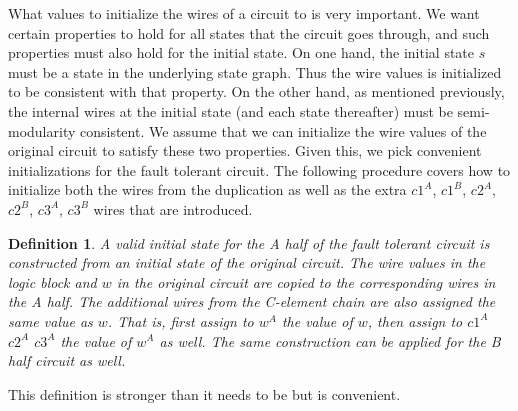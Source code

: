 \documentclass[12pt]{report}
\newtheorem*{definition}{Definition}
\begin{document}
What values to initialize the wires of a circuit to is very important.  We want certain properties to hold for all states that the circuit goes through, and such properties must also hold for the initial state.  On one hand, the initial state $s$ must be a state in the underlying state graph.  Thus the wire values is initialized to be consistent with that property.  On the other hand, as mentioned previously, the internal wires at the initial state (and each state thereafter) must be semi-modularity consistent.  We assume that we can initialize the wire values of the original circuit to satisfy these two properties.  Given this, we pick convenient initializations for the fault tolerant circuit.  The following procedure covers how to initialize both the wires from the duplication as well as the extra $c1^A$, $c1^B$, $c2^A$, $c2^B$, $c3^A$, $c3^B$ wires that are introduced.
\begin{definition} A {\em valid initial state} for the A half of the fault tolerant circuit is constructed from an initial state of the original circuit.  The wire values in the logic block and $w$ in the original circuit are copied to the corresponding wires in the A half.  The additional wires from the C-element chain are also assigned the same value as $w$.  That is, first assign to $w^A$ the value of $w$, then assign to $c1^A$ $c2^A$ $c3^A$ the value of $w^A$ as well. The same construction can be applied for the B half circuit as well.
\end{definition}
This definition is stronger than it needs to be but is convenient.\\

\end{document}

